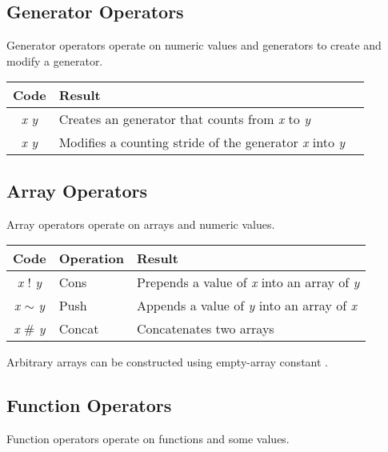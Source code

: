 \subsection{Generator Operators}

Generator operators operate on numeric values and generators to create and modify a generator.

\begin{tabulary}{\textwidth}{clL}
Code & Result \\
\hline
\emph{x}  \emph{y} & Creates an generator that counts from \emph{x} to \emph{y} \\
\emph{x}  \emph{y} & Modifies a counting stride of the generator \emph{x} into \emph{y} \\
\end{tabulary}

\subsection{Array Operators}

Array operators operate on arrays and numeric values.

\begin{tabulary}{\textwidth}{clL}
Code & Operation & Result \\
\hline
\emph{x} $!$ \emph{y} & Cons & Prepends a value of \emph{x} into an array of \emph{y} \\
\emph{x} $\sim$ \emph{y} & Push & Appends a value of \emph{y} into an array of \emph{x} \\
\emph{x} $\#$ \emph{y} & Concat & Concatenates two arrays \\
\end{tabulary}

\index{$!$}\index{$\sim$}\index{$\#$}Arbitrary arrays can be constructed using empty-array constant .

\subsection{Function Operators}

Function operators operate on functions and some values.

